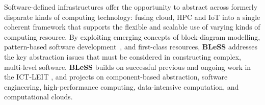 \documentclass[a4paper,11pt]{article}
\newcommand{\project}[1]{\textbf{#1}\xspace}
\newcommand{\BLESS}{\project{BLeSS}}
\newcommand{\TheProject}{\BLESS}
\begin{document}
Software-defined infrastructures offer the opportunity to abstract across formerly disparate kinds
of computing technology: fusing cloud, HPC and IoT into a single coherent framework that supports
the flexible and scalable use of varying kinds of computing resource.  By exploiting emerging concepts of block-diagram modelling,
pattern-based software development~\cite{RPL}, and first-class resources, \TheProject{} addresses the key abstraction
issues that must be considered in constructing complex, multi-level software.
\TheProject{} builds on successful previous and ongoing work in the ICT-LEIT \paraphrase, \rephrase and \teamplay projects
on component-based abstraction, software engineering, high-performance computing, data-intensive computation,
and computational clouds.  %
\end{document}
